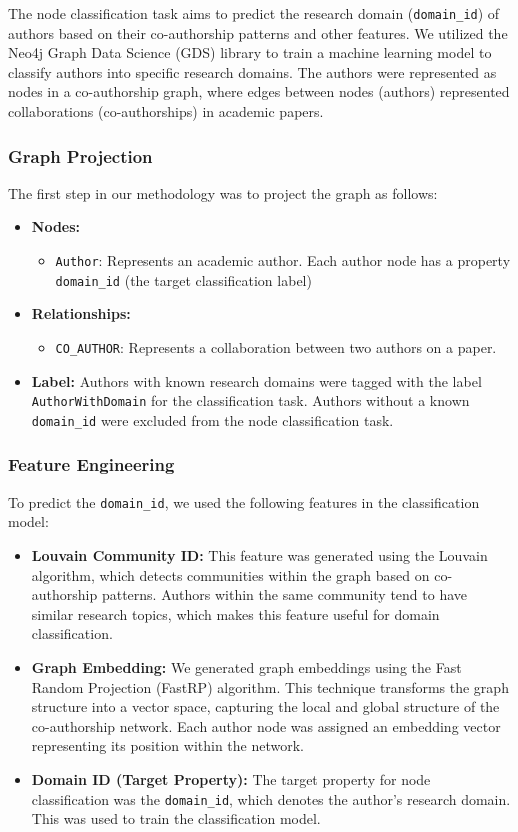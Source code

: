 \documentclass[conference, 12pt]{IEEEtran}
\begin{document}
The node classification task aims to predict the research domain (\texttt{domain\_id}) of authors based on their co-authorship patterns and other features. We utilized the Neo4j Graph Data Science (GDS) library to train a machine learning model to classify authors into specific research domains. The authors were represented as nodes in a co-authorship graph, where edges between nodes (authors) represented collaborations (co-authorships) in academic papers.

\subsubsection{Graph Projection}
The first step in our methodology was to project the graph as follows:
\begin{itemize}
  \item \textbf{Nodes:} 
    \begin{itemize}
      \item \texttt{Author}: Represents an academic author. Each author node has a property \texttt{domain\_id} (the target classification label)
    \end{itemize}
  \item \textbf{Relationships:} 
    \begin{itemize}
      \item \texttt{CO\_AUTHOR}: Represents a collaboration between two authors on a paper.
    \end{itemize}
  \item \textbf{Label:} Authors with known research domains were tagged with the label \texttt{AuthorWithDomain} for the classification task. Authors without a known \texttt{domain\_id} were excluded from the node classification task.
\end{itemize}


\subsubsection{Feature Engineering}
To predict the \texttt{domain\_id}, we used the following features in the classification model:

\begin{itemize}
  \item \textbf{Louvain Community ID:} This feature was generated using the Louvain algorithm, which detects communities within the graph based on co-authorship patterns. Authors within the same community tend to have similar research topics, which makes this feature useful for domain classification.
  \item \textbf{Graph Embedding:} We generated graph embeddings using the Fast Random Projection (FastRP) algorithm. This technique transforms the graph structure into a vector space, capturing the local and global structure of the co-authorship network. Each author node was assigned an embedding vector representing its position within the network.
  \item \textbf{Domain ID (Target Property):} The target property for node classification was the \texttt{domain\_id}, which denotes the author's research domain. This was used to train the classification model.
\end{itemize}
\end{document}
